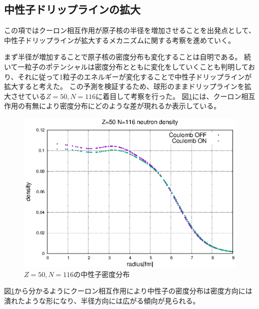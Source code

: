 \documentclass[12pt]{jarticle}
\begin{document}
\subsection{中性子ドリップラインの拡大}
この項ではクーロン相互作用が原子核の半径を増加させることを出発点として、中性子ドリップラインが拡大するメカニズムに関する考察を進めていく。

まず半径が増加することで原子核の密度分布も変化することは自明である。
続いて一粒子のポテンシャルは密度分布とともに変化をしていくことも判明しており、それに従って1粒子のエネルギーが変化することで中性子ドリップラインが拡大すると考えた。
この予測を検証するため、球形のままドリップラインを拡大させている$Z=50,N=116$に着目して考察を行った。
図\ref{fig:SLY4_ON_Z=50_N=116_density}には、クーロン相互作用の有無により密度分布にどのような差が現れるか表示している。
\begin{figure}[H]
    \centering
    \includegraphics{../SLY4_Z=50_N=116_densityN.eps}
    \caption{$Z=50,N=116$の中性子密度分布}\label{fig:SLY4_ON_Z=50_N=116_density}
\end{figure}
図\ref{fig:SLY4_ON_Z=50_N=116_density}から分かるようにクーロン相互作用により中性子の密度分布は密度方向には潰れたような形になり、半径方向には広がる傾向が見られる。
\end{document}
